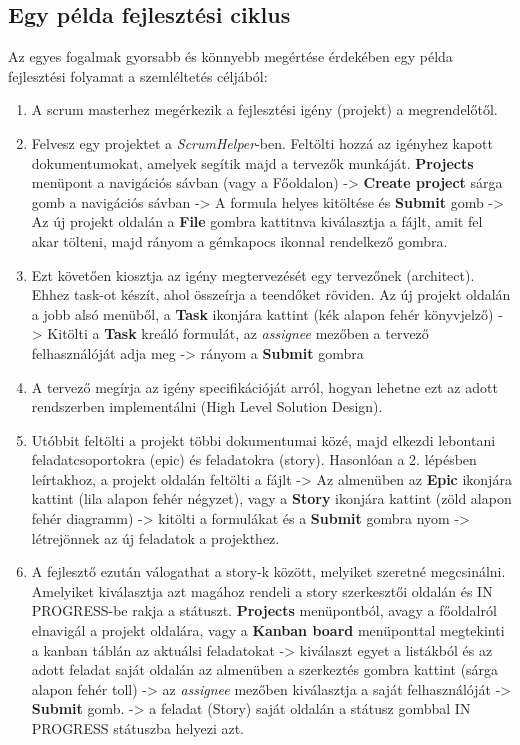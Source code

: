 \subsection{Egy példa fejlesztési ciklus}
\label{example_workflow}

Az egyes fogalmak gyorsabb és könnyebb megértése érdekében egy példa fejlesztési folyamat a szemléltetés céljából:

\begin{enumerate}
	\item A scrum masterhez megérkezik a fejlesztési igény (projekt) a megrendelőtől.
	\item Felvesz egy projektet a \textit{ScrumHelper}-ben. Feltölti hozzá az igényhez kapott dokumentumokat, amelyek segítik majd a tervezők munkáját. \textbf{Projects} menüpont a navigációs sávban (vagy a Főoldalon) -> \textbf{Create project} sárga gomb a navigációs sávban -> A formula helyes kitöltése és \textbf{Submit} gomb -> Az új projekt oldalán a \textbf{File} gombra kattitnva kiválasztja a fájlt, amit fel akar tölteni, majd rányom a gémkapocs ikonnal rendelkező gombra.
	\item Ezt követően kiosztja az igény megtervezését egy tervezőnek (architect). Ehhez task-ot készít, ahol összeírja a teendőket röviden. Az új projekt oldalán a jobb alsó menüből, a \textbf{Task} ikonjára kattint (kék alapon fehér könyvjelző) -> Kitölti a \textbf{Task} kreáló formulát, az \textit{assignee} mezőben a tervező felhasználóját adja meg -> rányom a \textbf{Submit} gombra
	\item A tervező megírja az igény specifikációját arról, hogyan lehetne ezt az adott rendszerben implementálni (High Level Solution Design).
	\item Utóbbit feltölti a projekt többi dokumentumai közé, majd elkezdi lebontani feladatcsoportokra (epic) és feladatokra (story). Hasonlóan a 2. lépésben leírtakhoz, a projekt oldalán feltölti a fájlt -> Az almenüben az \textbf{Epic} ikonjára kattint (lila alapon fehér négyzet), vagy a \textbf{Story} ikonjára kattint (zöld alapon fehér diagramm) -> kitölti a formulákat és a \textbf{Submit} gombra nyom -> létrejönnek az új feladatok a projekthez.
	\item A fejlesztő ezután válogathat a story-k között, melyiket szeretné megcsinálni. Amelyiket kiválasztja azt magához rendeli a story szerkesztői oldalán és IN PROGRESS-be rakja a státuszt. \textbf{Projects} menüpontból, avagy a főoldalról elnavigál a projekt oldalára, vagy a \textbf{Kanban board} menüponttal megtekinti a kanban táblán az aktuálsi feladatokat -> kiválaszt egyet a listákból és az adott feladat saját oldalán az almenüben a szerkeztés gombra kattint (sárga alapon fehér toll) -> az \textit{assignee} mezőben kiválasztja a saját felhasználóját -> \textbf{Submit} gomb. -> a feladat (Story) saját oldalán a státusz gombbal IN PROGRESS státuszba helyezi azt.

\end{enumerate}

